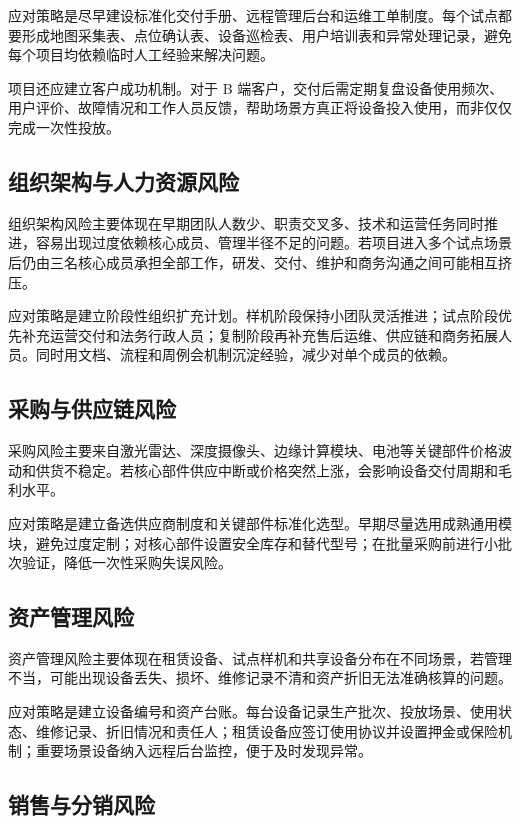 \documentclass[a4paper,fontset=none]{ctexart}
\begin{document}
应对策略是尽早建设标准化交付手册、远程管理后台和运维工单制度。每个试点都要形成地图采集表、点位确认表、设备巡检表、用户培训表和异常处理记录，避免每个项目均依赖临时人工经验来解决问题。

项目还应建立客户成功机制。对于 B 端客户，交付后需定期复盘设备使用频次、用户评价、故障情况和工作人员反馈，帮助场景方真正将设备投入使用，而非仅仅完成一次性投放。

\subsection{组织架构与人力资源风险}

组织架构风险主要体现在早期团队人数少、职责交叉多、技术和运营任务同时推进，容易出现过度依赖核心成员、管理半径不足的问题。若项目进入多个试点场景后仍由三名核心成员承担全部工作，研发、交付、维护和商务沟通之间可能相互挤压。

应对策略是建立阶段性组织扩充计划。样机阶段保持小团队灵活推进；试点阶段优先补充运营交付和法务行政人员；复制阶段再补充售后运维、供应链和商务拓展人员。同时用文档、流程和周例会机制沉淀经验，减少对单个成员的依赖。

\subsection{采购与供应链风险}

采购风险主要来自激光雷达、深度摄像头、边缘计算模块、电池等关键部件价格波动和供货不稳定。若核心部件供应中断或价格突然上涨，会影响设备交付周期和毛利水平。

应对策略是建立备选供应商制度和关键部件标准化选型。早期尽量选用成熟通用模块，避免过度定制；对核心部件设置安全库存和替代型号；在批量采购前进行小批次验证，降低一次性采购失误风险。

\subsection{资产管理风险}

资产管理风险主要体现在租赁设备、试点样机和共享设备分布在不同场景，若管理不当，可能出现设备丢失、损坏、维修记录不清和资产折旧无法准确核算的问题。

应对策略是建立设备编号和资产台账。每台设备记录生产批次、投放场景、使用状态、维修记录、折旧情况和责任人；租赁设备应签订使用协议并设置押金或保险机制；重要场景设备纳入远程后台监控，便于及时发现异常。

\subsection{销售与分销风险}
\end{document}
